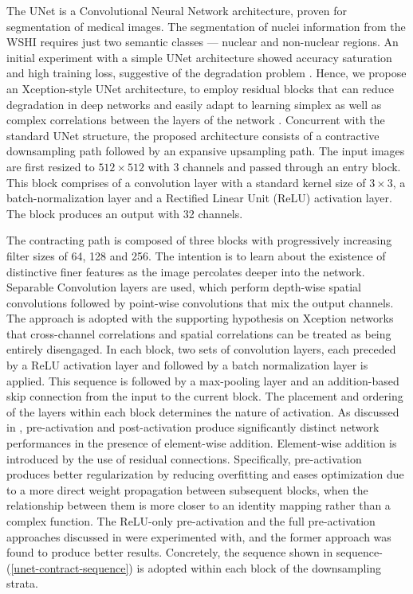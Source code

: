 \documentclass{comjnl}
\begin{document}
The UNet \cite{jonathan} is a Convolutional Neural Network architecture, proven for segmentation of medical images. The segmentation of nuclei information from the WSHI requires just two semantic classes --- nuclear and non-nuclear regions. An initial experiment with a simple UNet architecture showed accuracy saturation and high training loss, suggestive of the degradation problem \cite{kaiming}. Hence, we propose an Xception-style \cite{chollet} UNet architecture, to employ residual blocks that can reduce degradation in deep networks and easily adapt to learning simplex as well as complex correlations between the layers of the network \cite{veit}. Concurrent with the standard UNet structure, the proposed architecture consists of a contractive downsampling path followed by an expansive upsampling path. The input images are first resized to $512\times512$ with 3 channels and passed through an entry block. This block comprises of a convolution layer with a standard kernel size of $3\times3$, a batch-normalization layer and a Rectified Linear Unit (ReLU) activation layer. The block produces an output with 32 channels.
 
The contracting path is composed of three blocks with progressively increasing filter sizes of 64, 128 and 256. The intention is to learn about the existence of distinctive finer features as the image percolates deeper into the network. Separable Convolution layers are used, which perform depth-wise spatial convolutions followed by point-wise convolutions that mix the output channels. The approach is adopted with the supporting hypothesis on Xception networks that cross-channel correlations and spatial correlations can be treated as being entirely disengaged. In each block, two sets of convolution layers, each preceded by a ReLU activation layer and followed by a batch normalization layer is applied. This sequence is followed by a max-pooling layer and an addition-based skip connection from the input to the current block. The placement and ordering of the layers within each block determines the nature of activation. As discussed in \cite{kaiming}, pre-activation and post-activation produce significantly distinct network performances in the presence of element-wise addition. Element-wise addition is introduced by the use of residual connections. Specifically, pre-activation produces better regularization by reducing overfitting and eases optimization due to a more direct weight propagation between subsequent blocks, when the relationship between them is more closer to an identity mapping rather than a complex function. The ReLU-only pre-activation and the full pre-activation approaches discussed in \cite{kaiming} were experimented with, and the former approach was found to produce better results. Concretely, the sequence shown in sequence-(\ref{unet-contract-sequence}) is adopted within each block of the downsampling strata.
\end{document}

